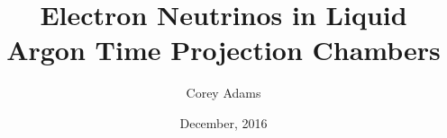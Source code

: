 


\title{Electron Neutrinos in Liquid Argon Time Projection Chambers}
\author{Corey Adams}
\date{December, 2016} %

\frontmatter



\maketitle






\tableofcontents
\listoffigures %
\listoftables %